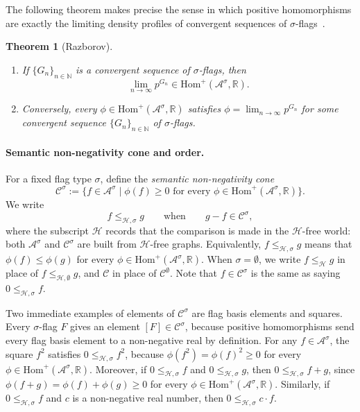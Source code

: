 \documentclass{article}
\newtheorem{theorem}{Theorem}[section]
\newcommand{\poshom}[1]{\mathrm{Hom}^+(\mathcal{A}^{#1}, \mathbb{R})}
\begin{document}
The following theorem makes precise the sense in which positive homomorphisms
are exactly the limiting density profiles of convergent sequences of
$\sigma$-flags~\cite{razborov2007flag}.

\begin{theorem}[Razborov]\label{thm:convergent-hom}
  \begin{enumerate}
  \item[\textup{(a)}] If $\{G_n\}_{n\in\mathbb{N}}$ is a convergent sequence of
    $\sigma$-flags, then
    \[
      \lim_{n\to\infty} p^{G_n} \in \poshom{\sigma}.
    \]
  \item[\textup{(b)}] Conversely, every $\phi \in \poshom{\sigma}$ satisfies
    $\phi = \lim_{n\to\infty} p^{G_n}$ for some convergent sequence
    $\{G_n\}_{n\in\mathbb{N}}$ of $\sigma$-flags.
  \end{enumerate}
\end{theorem}

\paragraph{Semantic non-negativity cone and order.}
For a fixed flag type $\sigma$, define the \emph{semantic non-negativity cone}
\[
  \mathcal{C}^\sigma
  :=
  \{f \in \mathcal{A}^\sigma
    \mid \phi(f) \geq 0
    \text{ for every } \phi \in \poshom{\sigma}\}.
\]
We write
\[
  f \leq_{\mathcal{H},\sigma} g
  \qquad\text{when}\qquad
  g-f \in \mathcal{C}^\sigma,
\]
where the subscript $\mathcal{H}$ records that the comparison is made in the
\(\mathcal{H}\)-free world: both $\mathcal{A}^\sigma$ and $\mathcal{C}^\sigma$ are
built from \(\mathcal{H}\)-free graphs.
Equivalently, $f\leq_{\mathcal{H},\sigma} g$ means that
$\phi(f)\leq\phi(g)$ for every $\phi \in \poshom{\sigma}$.  When $\sigma=\emptyset$, we write $f \leq_{\mathcal{H}} g$ in place of $f \leq_{\mathcal{H},\emptyset} g$, and $\mathcal{C}$ in place of $\mathcal{C}^\emptyset$.
Note that $f \in \mathcal{C}^\sigma$ is the same as saying $0 \leq_{\mathcal{H},\sigma} f$.

Two immediate examples of elements of $\mathcal{C}^\sigma$ are flag basis
elements and squares.  Every $\sigma$-flag $F$ gives an element
$[F]\in\mathcal{C}^\sigma$, because positive homomorphisms send every flag
basis element to a non-negative real by definition.
For any $f \in \mathcal{A}^\sigma$, the square $f^2$ satisfies $0 \leq_{\mathcal{H},\sigma} f^2$,
because $\phi(f^2) = \phi(f)^2 \geq 0$ for every~$\phi \in \poshom{\sigma}$.
Moreover, if $0 \leq_{\mathcal{H},\sigma} f$ and $0 \leq_{\mathcal{H},\sigma} g$, then $0 \leq_{\mathcal{H},\sigma} f + g$,
since $\phi(f+g) = \phi(f) + \phi(g) \geq 0$ for every $\phi \in \poshom{\sigma}$.
Similarly, if $0 \leq_{\mathcal{H},\sigma} f$ and $c$ is a non-negative real number, then $0 \leq_{\mathcal{H},\sigma} c \cdot f$.
\end{document}
